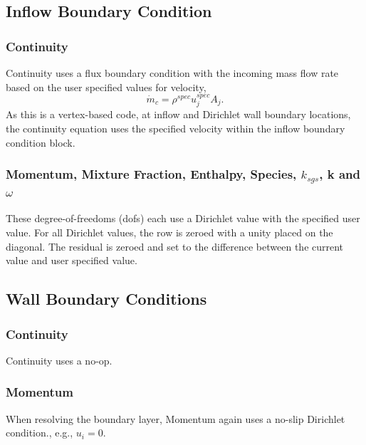 \subsection{Inflow Boundary Condition}

\subsubsection{Continuity}
Continuity uses a flux boundary condition with the incoming
mass flow rate based on the user specified values for velocity,
\begin{equation}
  \dot{m}_c = \rho^{spec} u^{spec}_j A_j.
\end{equation}
As this is a vertex-based code, at inflow and Dirichlet wall boundary locations,
the continuity equation uses the specified velocity within the inflow boundary condition
block.

\subsubsection{Momentum, Mixture Fraction, Enthalpy, Species, $k_{sgs}$, k and $\omega$}
These degree-of-freedoms (dofs) each use a Dirichlet value with the specified user value.
For all Dirichlet values, the row is zeroed with a unity placed
on the diagonal. The residual is zeroed and set to the difference
between the current value and user specified value.

\subsection{Wall Boundary Conditions}

\subsubsection{Continuity}
Continuity uses a no-op.

\subsubsection{Momentum}
When resolving the boundary layer, Momentum again uses a no-slip 
Dirichlet condition., e.g., $u_i = 0$. 

